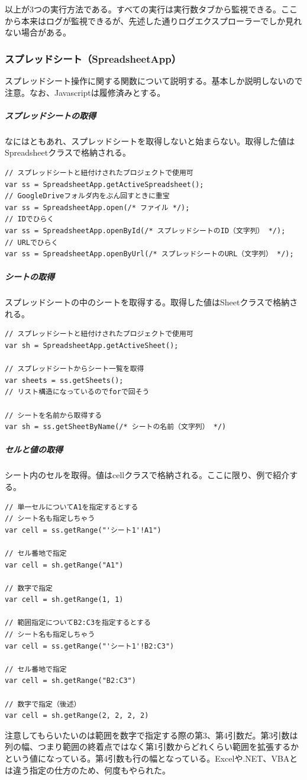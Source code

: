 \documentclass[a4paper]{ltjsreport}
\begin{document}
以上が3つの実行方法である。すべての実行は実行数タブから監視できる。ここから本来はログが監視できるが、先述した通りログエクスプローラーでしか見れない場合がある。

\subsubsection{スプレッドシート（SpreadsheetApp）}
スプレッドシート操作に関する関数について説明する。基本しか説明しないので注意。なお、Javascriptは履修済みとする。

\subparagraph{スプレッドシートの取得}
なにはともあれ、スプレッドシートを取得しないと始まらない。取得した値はSpreadsheetクラスで格納される。
\lstset{language=JavaScript}
\begin{lstlisting}
// スプレッドシートと紐付けされたプロジェクトで使用可
var ss = SpreadsheetApp.getActiveSpreadsheet();
// GoogleDriveフォルダ内をぶん回すときに重宝
var ss = SpreadsheetApp.open(/* ファイル */);
// IDでひらく
var ss = SpreadsheetApp.openById(/* スプレッドシートのID（文字列） */);
// URLでひらく
var ss = SpreadsheetApp.openByUrl(/* スプレッドシートのURL（文字列） */);
\end{lstlisting}

\subparagraph{シートの取得}
スプレッドシートの中のシートを取得する。取得した値はSheetクラスで格納される。
\begin{lstlisting}
// スプレッドシートと紐付けされたプロジェクトで使用可
var sh = SpreadsheetApp.getActiveSheet();

// スプレッドシートからシート一覧を取得
var sheets = ss.getSheets();
// リスト構造になっているのでforで回そう

// シートを名前から取得する
var sh = ss.getSheetByName(/* シートの名前（文字列） */)
\end{lstlisting}

\subparagraph{セルと値の取得}
シート内のセルを取得。値はcellクラスで格納される。ここに限り、例で紹介する。
\begin{lstlisting}
// 単一セルについてA1を指定するとする
// シート名も指定しちゃう
var cell = ss.getRange("'シート1'!A1")

// セル番地で指定
var cell = sh.getRange("A1")

// 数字で指定
var cell = sh.getRange(1, 1)

// 範囲指定についてB2:C3を指定するとする
// シート名も指定しちゃう
var cell = ss.getRange("'シート1'!B2:C3")

// セル番地で指定
var cell = sh.getRange("B2:C3")

// 数字で指定（後述）
var cell = sh.getRange(2, 2, 2, 2)

\end{lstlisting}
注意してもらいたいのは範囲を数字で指定する際の第3、第4引数だ。第3引数は列の幅、つまり範囲の終着点ではなく第1引数からどれくらい範囲を拡張するかという値になっている。第4引数も行の幅となっている。Excelや.NET、VBAとは違う指定の仕方のため、何度もやられた。
\end{document}
